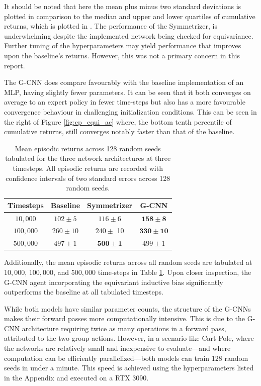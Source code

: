 It should be noted that here the mean plus minus two standard deviations is plotted in comparison to the median and upper and lower quartiles of cumulative returns, which is plotted in \cite{vanderpol2020mdp}. The performance of the Symmetrizer, is underwhelming despite the implemented network being checked for equivariance. Further tuning of the hyperparameters may yield performance that improves upon the baseline's returns. However, this was not a primary concern in this report.

The G-CNN does compare favourably with the baseline implementation of an MLP, having slightly fewer parameters. It can be seen that it both converges on average to an expert policy in fewer time-steps but also has a more favourable convergence behaviour in challenging initialization conditions. This can be seen in the right of Figure \ref{fig:cp_equi_ac} where, the bottom tenth percentile of cumulative returns, still converges notably faster than that of the baseline.

\begin{table}
	\centering
	\begin{tabular}{|c|c|c|c|}
		\hline
		Timesteps  & Baseline     & Symmetrizer          & G-CNN                 \\
		\hline
		$10, 000$  & $102 \pm 5$  & $116 \pm 6$          & $\mathbf{158 \pm 8}$  \\
		$100, 000$ & $260 \pm 10$ & $240 \pm$ 10         & $\mathbf{330 \pm 10}$ \\
		$500,000$  & $497 \pm 1$  & $\mathbf{500 \pm 1}$ & $499 \pm 1$           \\
		\hline
	\end{tabular}
	\caption{Mean episodic returns across 128 random seeds tabulated for the three network architectures at three timesteps. All episodic returns are recorded with confidence intervals of two standard errors across 128 random seeds.}
	\label{tab:actor-critic}
\end{table}
Additionally, the mean episodic returns across all random seeds are tabulated at $10,000$, $100,000$, and $500,000$ time-steps in Table \ref{tab:actor-critic}. Upon closer inspection, the G-CNN agent incorporating the equivariant inductive bias significantly outperforms the baseline at all tabulated timesteps.

While both models have similar parameter counts, the structure of the G-CNNs makes their forward passes more computationally intensive. This is due to the G-CNN architecture requiring twice as many operations in a forward pass, attributed to the two group actions. However, in a scenario like Cart-Pole, where the networks are relatively small and inexpensive to evaluate—and where computation can be efficiently parallelized—both models can train 128 random seeds in under a minute. This speed is achieved using the hyperparameters listed in the Appendix and executed on a RTX 3090.

